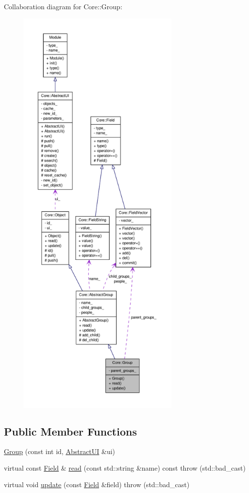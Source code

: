 Collaboration diagram for Core::Group:
\nopagebreak
\begin{figure}[H]
\begin{center}
\leavevmode
\includegraphics[height=600pt]{d7/da7/classCore_1_1Group__coll__graph}
\end{center}
\end{figure}
\subsection*{Public Member Functions}
\begin{DoxyCompactItemize}
\item 
\hyperlink{classCore_1_1Group_aaa7bccc1c48790f6eb7d94db20a7b3c2}{Group} (const int id, \hyperlink{classCore_1_1AbstractUI}{AbstractUI} \&ui)
\item 
virtual const \hyperlink{classCore_1_1Field}{Field} \& \hyperlink{classCore_1_1Group_a0f4f5f00e11faeaaf09600d5b4943012}{read} (const std::string \&name) const   throw (std::bad\_\-cast)
\item 
virtual void \hyperlink{classCore_1_1Group_a9878d4ec0b02890502c6cff69da1e332}{update} (const \hyperlink{classCore_1_1Field}{Field} \&field)  throw (std::bad\_\-cast)
\end{DoxyCompactItemize}


